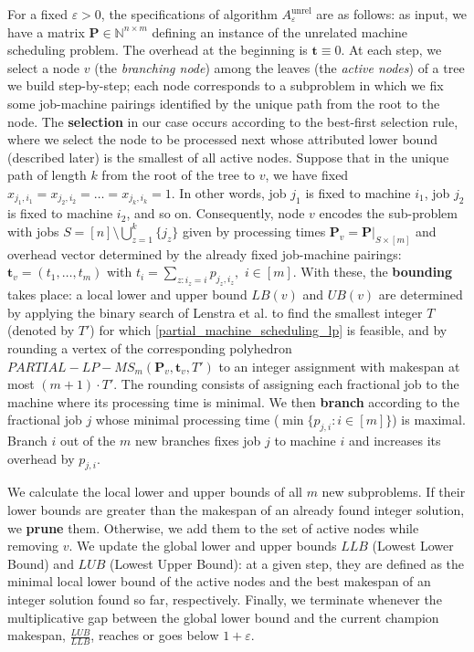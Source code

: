 \documentclass[moor,sglanonrev]{informs4}
\theoremstyle{plain}
\begin{document}
For a fixed $\varepsilon > 0$, the specifications of algorithm $A^{\text{unrel}}_{\varepsilon}$ are as follows: as input, we have a matrix $\bm{P} \in \mathbb{N}^{n \times m}$ defining an instance of the unrelated machine scheduling problem. The overhead at the beginning is $\bm{t}\equiv 0$. At each step, we select a node $v$ (the \emph{branching node}) among the leaves (the \emph{active nodes}) of a tree we build step-by-step; each node corresponds to a subproblem in which we fix some job-machine pairings identified by the unique path from the root to the node. The \textbf{selection} in our case occurs according to the best-first selection rule, where we select the node to be processed next whose attributed lower bound (described later) is the smallest of all active nodes. Suppose that in the unique path of length $k$ from the root of the tree to $v$, we have fixed $x_{j_1, i_1} = x_{j_2, i_2} = \ldots = x_{j_k, i_k} = 1$. In other words, job $j_1$ is fixed to machine $i_1$, job $j_2$ is fixed to machine $i_2$, and so on. Consequently, node $v$ encodes the sub-problem with jobs $S=[n]\setminus \bigcup_{z=1}^k \{j_z\}$ given by processing times $\bm{P}_v=\bm{P}|_{S \times [m]}$ and overhead vector determined by the already fixed job-machine pairings: $\bm{t}_v= (t_1, \ldots, t_m)$ with $t_i= \sum\limits_{z: i_z = i} p_{j_z, i_z}, \,\, i \in [m]$. With these, the \textbf{bounding} takes place: a local lower and upper bound $LB(v)$ and $UB(v)$ are determined by applying the binary search of Lenstra et al. to find the smallest integer $T$ (denoted by $T'$) for which \eqref{partial_machine_scheduling_lp} is feasible, and by rounding a vertex of the corresponding polyhedron $PARTIAL-LP-MS_m(\bm{P}_v, \bm{t}_v, T')$ to an integer assignment with makespan at most $(m+1)\cdot T'$. The rounding consists of assigning each fractional job to the machine where its processing time is minimal. We then \textbf{branch} according to the fractional job $j$ whose minimal processing time ($\min\{p_{j,i}: i\in [m]\}$) is maximal. Branch $i$ out of the $m$ new branches fixes job $j$ to machine $i$ and increases its overhead by $p_{j, i}$. 

We calculate the local lower and upper bounds of all $m$ new subproblems. If their lower bounds are greater than the makespan of an already found integer solution, we \textbf{prune} them. Otherwise, we add them to the set of active nodes while removing $v$. We update the global lower and upper bounds $LLB$ (Lowest Lower Bound) and $LUB$ (Lowest Upper Bound): at a given step, they are defined as the minimal local lower bound of the active nodes and the best makespan of an integer solution found so far, respectively. Finally, we terminate whenever the multiplicative gap between the global lower bound and the current champion makespan, $\frac{LUB}{LLB}$, reaches or goes below $1+\varepsilon$.
\end{document}
